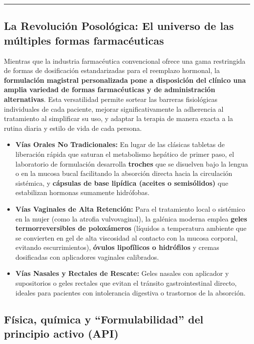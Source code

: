 \documentclass[
  spanish,
]{article}
\begin{document}
\begin{center}\rule{0.5\linewidth}{0.5pt}\end{center}

\subsection{La Revolución Posológica: El universo de las múltiples formas farmacéuticas}\label{la-revoluciuxf3n-posoluxf3gica-el-universo-de-las-muxfaltiples-formas-farmacuxe9uticas}

Mientras que la industria farmacéutica convencional ofrece una gama restringida de formas de dosificación estandarizadas para el reemplazo hormonal, la \textbf{formulación magistral personalizada pone a disposición del clínico una amplia variedad de formas farmacéuticas y de administración alternativas}. Esta versatilidad permite sortear las barreras fisiológicas individuales de cada paciente, mejorar significativamente la adherencia al tratamiento al simplificar su uso, y adaptar la terapia de manera exacta a la rutina diaria y estilo de vida de cada persona.

\begin{itemize}
\item
  \textbf{Vías Orales No Tradicionales:} En lugar de las clásicas tabletas de liberación rápida que saturan el metabolismo hepático de primer paso, el laboratorio de formulación desarrolla \textbf{troches} que se disuelven bajo la lengua o en la mucosa bucal facilitando la absorción directa hacia la circulación sistémica, y \textbf{cápsulas de base lipídica (aceites o semisólidos)} que estabilizan hormonas sumamente hidrófobas.
\item
  \textbf{Vías Vaginales de Alta Retención:} Para el tratamiento local o sistémico en la mujer (como la atrofia vulvovaginal), la galénica moderna emplea \textbf{geles termorreversibles de poloxámeros} (líquidos a temperatura ambiente que se convierten en gel de alta viscosidad al contacto con la mucosa corporal, evitando escurrimientos), \textbf{óvulos lipofílicos o hidrófilos} y cremas dosificadas con aplicadores vaginales calibrados.
\item
  \textbf{Vías Nasales y Rectales de Rescate:} Geles nasales con aplicador y supositorios o geles rectales que evitan el tránsito gastrointestinal directo, ideales para pacientes con intolerancia digestiva o trastornos de la absorción.
\end{itemize}

\subsection{Física, química y ``Formulabilidad'' del principio activo (API)}\label{fuxedsica-quuxedmica-y-formulabilidad-del-principio-activo-api}
\end{document}

